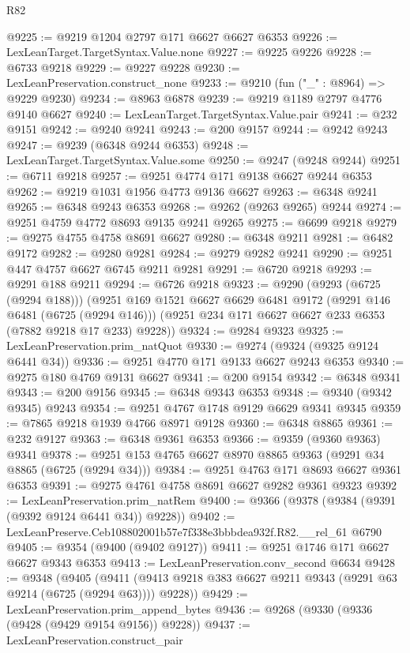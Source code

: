 \begin{lexlean}{R82}
\begin{coremodule}
@9225 := @9219 @1204 @2797 @171 @6627 @6627 @6353
@9226 := LexLeanTarget.TargetSyntax.Value.none
@9227 := @9225 @9226
@9228 := @6733 @9218
@9229 := @9227 @9228
@9230 := LexLeanPreservation.construct_none
@9233 := @9210 (fun ("_" : @8964) => @9229 @9230)
@9234 := @8963 @6878
@9239 := @9219 @1189 @2797 @4776 @9140 @6627
@9240 := LexLeanTarget.TargetSyntax.Value.pair
@9241 := @232 @9151
@9242 := @9240 @9241
@9243 := @200 @9157
@9244 := @9242 @9243
@9247 := @9239 (@6348 @9244 @6353)
@9248 := LexLeanTarget.TargetSyntax.Value.some
@9250 := @9247 (@9248 @9244)
@9251 := @6711 @9218
@9257 := @9251 @4774 @171 @9138 @6627 @9244 @6353
@9262 := @9219 @1031 @1956 @4773 @9136 @6627
@9263 := @6348 @9241
@9265 := @6348 @9243 @6353
@9268 := @9262 (@9263 @9265) @9244
@9274 := @9251 @4759 @4772 @8693 @9135 @9241 @9265
@9275 := @6699 @9218
@9279 := @9275 @4755 @4758 @8691 @6627
@9280 := @6348 @9211
@9281 := @6482 @9172
@9282 := @9280 @9281
@9284 := @9279 @9282 @9241
@9290 := @9251 @447 @4757 @6627 @6745 @9211 @9281
@9291 := @6720 @9218
@9293 := @9291 @188 @9211
@9294 := @6726 @9218
@9323 := @9290
    (@9293 (@6725 (@9294 @188)))
    (@9251
      @169
      @1521
      @6627
      @6629
      @6481
      @9172
      (@9291 @146 @6481 (@6725 (@9294 @146)))
      (@9251 @234 @171 @6627 @6627 @233 @6353 (@7882 @9218 @17 @233) @9228))
@9324 := @9284 @9323
@9325 := LexLeanPreservation.prim_natQuot
@9330 := @9274 (@9324 (@9325 @9124 @6441 @34))
@9336 := @9251 @4770 @171 @9133 @6627 @9243 @6353
@9340 := @9275 @180 @4769 @9131 @6627
@9341 := @200 @9154
@9342 := @6348 @9341
@9343 := @200 @9156
@9345 := @6348 @9343 @6353
@9348 := @9340 (@9342 @9345) @9243
@9354 := @9251 @4767 @1748 @9129 @6629 @9341 @9345
@9359 := @7865 @9218 @1939 @4766 @8971 @9128
@9360 := @6348 @8865
@9361 := @232 @9127
@9363 := @6348 @9361 @6353
@9366 := @9359 (@9360 @9363) @9341
@9378 := @9251 @153 @4765 @6627 @8970 @8865 @9363 (@9291 @34 @8865 (@6725 (@9294 @34)))
@9384 := @9251 @4763 @171 @8693 @6627 @9361 @6353
@9391 := @9275 @4761 @4758 @8691 @6627 @9282 @9361 @9323
@9392 := LexLeanPreservation.prim_natRem
@9400 := @9366 (@9378 (@9384 (@9391 (@9392 @9124 @6441 @34)) @9228))
@9402 := LexLeanPreserve.Ceb108802001b57e7f338e3bbbdea932f.R82.__rel_61 @6790
@9405 := @9354 (@9400 (@9402 @9127))
@9411 := @9251 @1746 @171 @6627 @6627 @9343 @6353
@9413 := LexLeanPreservation.conv_second @6634
@9428 := @9348
    (@9405 (@9411 (@9413 @9218 @383 @6627 @9211 @9343 (@9291 @63 @9214 (@6725 (@9294 @63)))) @9228))
@9429 := LexLeanPreservation.prim_append_bytes
@9436 := @9268 (@9330 (@9336 (@9428 (@9429 @9154 @9156)) @9228))
@9437 := LexLeanPreservation.construct_pair

\end{coremodule}
\end{lexlean}
